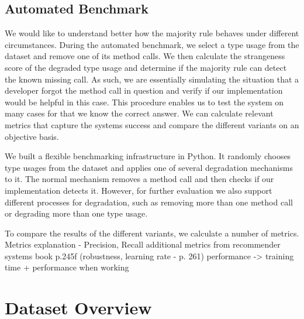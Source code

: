\subsection{Automated Benchmark}

We would like to understand better how the majority rule behaves under different circumstances.
During the automated benchmark, we select a type usage from the dataset and remove one of its method calls.
We then calculate the strangeness score of the degraded type usage and determine if the majority rule can detect the known missing call.
As such, we are essentially simulating the situation that a developer forgot the method call in question and verify if our implementation would be helpful in this case.
This procedure enables us to test the system on many cases for that we know the correct answer.
We can calculate relevant metrics that capture the systems success and compare the different variants on an objective basis.

We built a flexible benchmarking infrastructure in Python.
It randomly chooses type usages from the dataset and applies one of several degradation mechanisms to it.
The normal mechanism removes a method call and then checks if our implementation detects it.
However, for further evaluation we also support different processes for degradation, such as removing more than one method call or degrading more than one type usage.

To compare the results of the different variants, we calculate a number of metrics.
Metrics explanation - Precision, Recall
    additional metrics from recommender systems book p.245f (robustness, learning rate - p. 261)
    performance -> training time + performance when working


\section{Dataset Overview}

